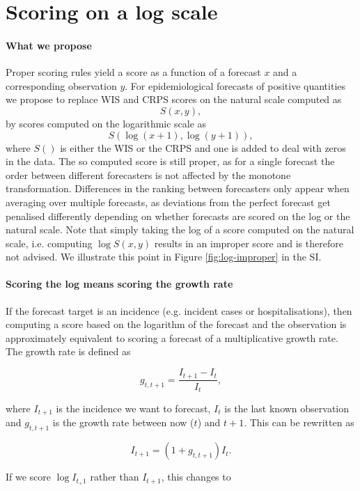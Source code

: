 \documentclass{article}
\begin{document}
\section{Scoring on a log scale}

\paragraph{What we propose}
Proper scoring rules yield a score as a function of a forecast $x$ and a corresponding observation $y$. For epidemiological forecasts of positive quantities we propose to replace WIS and CRPS scores on the natural scale computed as 
%
$$S(x, y), $$
%
by scores computed on the logarithmic scale as 
%
$$S(\log{(x + 1)}, \log{(y + 1)}), $$
where $S()$ is either the WIS or the CRPS and one is added to deal with zeros in the data. The so computed score is still proper, as for a single forecast the order between different forecasters is not affected by the monotone transformation. Differences in the ranking between forecasters only appear when averaging over multiple forecasts, as deviations from the perfect forecast get penalised differently depending on whether forecasts are scored on the log or the natural scale. Note that simply taking the log of a score computed on the natural scale, i.e. computing $\log S(x, y)$ results in an improper score and is therefore not advised. We illustrate this point in Figure \ref{fig:log-improper} in the SI. 

\paragraph{Scoring the log means scoring the growth rate}
If the forecast target is an incidence (e.g. incident cases or hospitalisations), then computing a score based on the logarithm of the forecast and the observation is approximately equivalent to scoring a forecast of a multiplicative growth rate. The growth rate is defined as 

$$ g_{t, t+1} = \frac{I_{t+1} - I_t}{I_t},$$

where $I_{t+1}$ is the incidence we want to forecast, $I_t$ is the last known observation and $g_{t, t+1}$ is the growth rate between now ($t$) and $t+1$. This can be rewritten as 

$$I_{t+1} = (1 + g_{t, t+1}) I_t.$$

If we score $\log I_{t_+1}$ rather than $I_{t+1}$, this changes to 
\end{document}
